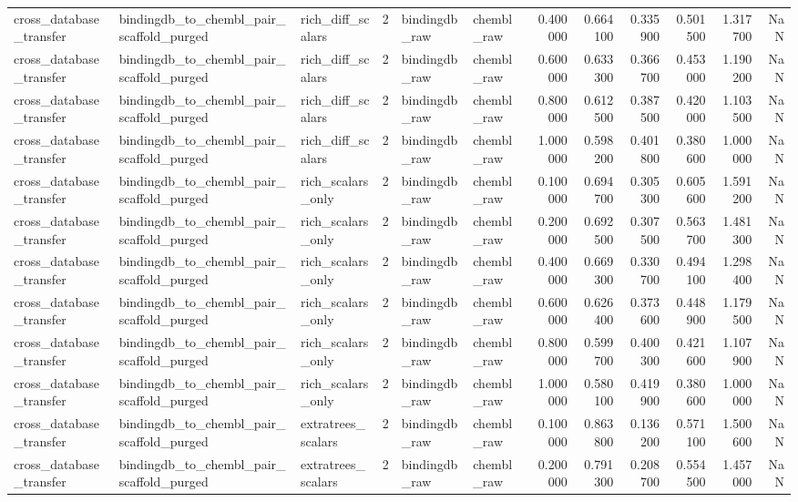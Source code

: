 \begin{longtable}{lllrllrrrrrr}
cross\_database\_transfer & bindingdb\_to\_chembl\_pair\_scaffold\_purged & rich\_diff\_scalars & 2 & bindingdb\_raw & chembl\_raw & 0.400000 & 0.664100 & 0.335900 & 0.501500 & 1.317700 & NaN \\
cross\_database\_transfer & bindingdb\_to\_chembl\_pair\_scaffold\_purged & rich\_diff\_scalars & 2 & bindingdb\_raw & chembl\_raw & 0.600000 & 0.633300 & 0.366700 & 0.453000 & 1.190200 & NaN \\
cross\_database\_transfer & bindingdb\_to\_chembl\_pair\_scaffold\_purged & rich\_diff\_scalars & 2 & bindingdb\_raw & chembl\_raw & 0.800000 & 0.612500 & 0.387500 & 0.420000 & 1.103500 & NaN \\
cross\_database\_transfer & bindingdb\_to\_chembl\_pair\_scaffold\_purged & rich\_diff\_scalars & 2 & bindingdb\_raw & chembl\_raw & 1.000000 & 0.598200 & 0.401800 & 0.380600 & 1.000000 & NaN \\
cross\_database\_transfer & bindingdb\_to\_chembl\_pair\_scaffold\_purged & rich\_scalars\_only & 2 & bindingdb\_raw & chembl\_raw & 0.100000 & 0.694700 & 0.305300 & 0.605600 & 1.591200 & NaN \\
cross\_database\_transfer & bindingdb\_to\_chembl\_pair\_scaffold\_purged & rich\_scalars\_only & 2 & bindingdb\_raw & chembl\_raw & 0.200000 & 0.692500 & 0.307500 & 0.563700 & 1.481300 & NaN \\
cross\_database\_transfer & bindingdb\_to\_chembl\_pair\_scaffold\_purged & rich\_scalars\_only & 2 & bindingdb\_raw & chembl\_raw & 0.400000 & 0.669300 & 0.330700 & 0.494100 & 1.298400 & NaN \\
cross\_database\_transfer & bindingdb\_to\_chembl\_pair\_scaffold\_purged & rich\_scalars\_only & 2 & bindingdb\_raw & chembl\_raw & 0.600000 & 0.626400 & 0.373600 & 0.448900 & 1.179500 & NaN \\
cross\_database\_transfer & bindingdb\_to\_chembl\_pair\_scaffold\_purged & rich\_scalars\_only & 2 & bindingdb\_raw & chembl\_raw & 0.800000 & 0.599700 & 0.400300 & 0.421600 & 1.107900 & NaN \\
cross\_database\_transfer & bindingdb\_to\_chembl\_pair\_scaffold\_purged & rich\_scalars\_only & 2 & bindingdb\_raw & chembl\_raw & 1.000000 & 0.580100 & 0.419900 & 0.380600 & 1.000000 & NaN \\
cross\_database\_transfer & bindingdb\_to\_chembl\_pair\_scaffold\_purged & extratrees\_scalars & 2 & bindingdb\_raw & chembl\_raw & 0.100000 & 0.863800 & 0.136200 & 0.571100 & 1.500600 & NaN \\
cross\_database\_transfer & bindingdb\_to\_chembl\_pair\_scaffold\_purged & extratrees\_scalars & 2 & bindingdb\_raw & chembl\_raw & 0.200000 & 0.791300 & 0.208700 & 0.554500 & 1.457000 & NaN \\

\end{longtable}
